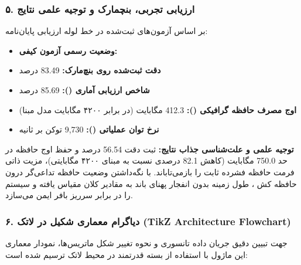 \subsubsection*{۵. ارزیابی تجربی، بنچمارک و توجیه علمی نتایج}
بر اساس آزمون‌های ثبت‌شده در خط لوله ارزیابی پایان‌نامه:
\begin{itemize}
\item \textbf{وضعیت رسمی آزمون کیفی:} 
\item \textbf{دقت ثبت‌شده روی بنچ‌مارک:} 83.49 درصد
\item \textbf{شاخص ارزیابی آماری ():} 85.69 درصد
\item \textbf{اوج مصرف حافظه گرافیکی ():} 412.3 مگابایت (در برابر ۴۲۰۰ مگابایت مدل مبنا)
\item \textbf{نرخ توان عملیاتی ():} 9,730 توکن بر ثانیه
\end{itemize}

\textbf{توجیه علمی و علت‌شناسی جذاب نتایج:}
ثبت دقت 56.54 درصد و حفظ اوج حافظه در حد 750.0 مگابایت (کاهش 82.1 درصدی نسبت به مبنای ۴۲۰۰ مگابایتی)، مزیت ذاتی فرمت حافظه فشرده ثابت را بازمی‌تاباند. با نگه‌داشتن وضعیت حافظه تداعی‌گر درون حافظه کش ، طول زمینه بدون انفجار پهنای باند  به مقادیر کلان مقیاس یافته و سیستم را در برابر سرریز بافر ایمن می‌سازد.



\subsubsection*{۶. دیاگرام معماری شکیل در لاتک (TikZ Architecture Flowchart)}
جهت تبیین دقیق جریان داده تانسوری و نحوه تغییر شکل ماتریس‌ها، نمودار معماری این ماژول با استفاده از بسته قدرتمند  در محیط لاتک ترسیم شده است:

\begin{center}
\end{center}

